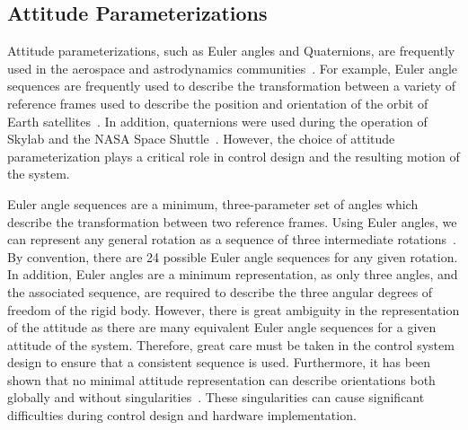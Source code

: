 \subsection{Attitude Parameterizations}\label{ssec:attitude_parameterization}
Attitude parameterizations, such as Euler angles and Quaternions, are frequently used in the aerospace and astrodynamics communities~\cite{vallado2007}.
For example, Euler angle sequences are frequently used to describe the transformation between a variety of reference frames used to describe the position and orientation of the orbit of Earth satellites~\cite{vallado2007}.
In addition, quaternions were used during the operation of Skylab and the NASA Space Shuttle~\cite{hughes2004}.
However, the choice of attitude parameterization plays a critical role in control design and the resulting motion of the system.

Euler angle sequences are a minimum, three-parameter set of angles which describe the transformation between two reference frames.
Using Euler angles, we can represent any general rotation as a sequence of three intermediate rotations~\cite{shuster1993}.
By convention, there are \num{24} possible Euler angle sequences for any given rotation.
In addition, Euler angles are a minimum representation, as only three angles, and the associated sequence, are required to describe the three angular degrees of freedom of the rigid body.
However, there is great ambiguity in the representation of the attitude as there are many equivalent Euler angle sequences for a given attitude of the system.
Therefore, great care must be taken in the control system design to ensure that a consistent sequence is used. 
Furthermore, it has been shown that no minimal attitude representation can describe orientations both globally and without singularities~\cite{hughes2004,bhat2000}.
These singularities can cause significant difficulties during control design and hardware implementation.

